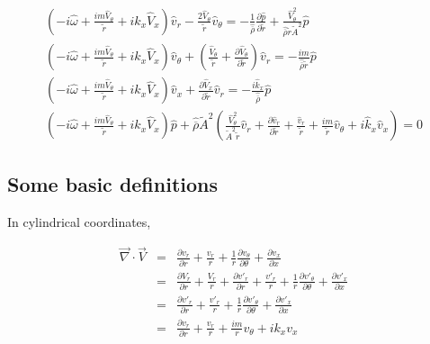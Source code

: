 \documentclass[12pt]{article}
\begin{document}
\begin{small}
\begin{eqnarray}
\left(
-i \widehat{\omega} 
+ \frac{i m \widehat{V}_{\theta}}{\widetilde{r}}
+i \widehat{k}_x \widehat{V}_x 
\right) 
\widehat{v}_r 
-\frac{2 \widehat{V}_{\theta}}{\widetilde{r}} \widehat{v}_{\theta}
 = 
-\frac{1}{\widehat{\overline{\rho}}} \frac{\partial \widehat{p}}{\partial \widetilde{r}}
+\frac{\widehat{V}_{\theta}^2}{\widehat{\overline{\rho}} \widetilde{r} \widetilde{A}^2} 
\widehat{p}
\nonumber
\\
\left(
-i \widehat{\omega} 
+ \frac{i m \widehat{V}_{\theta}}{\widetilde{r}}
+i \widehat{k}_x \widehat{V}_x 
\right) 
\widehat{v}_{\theta} 
+
\left(
\frac{\widehat{V}_{\theta}}{\widetilde{r}}
+\frac{\partial \widehat{V}_{\theta}}{\partial \widetilde{r}}
\right) \widehat{v}_r
 = 
-\frac{i m}{\widehat{\overline{\rho}} \widetilde{r}} \widehat{p}
\nonumber
\\
\left(
-i \widehat{\omega}
+ \frac{i m \widehat{V}_{\theta}}{\widetilde{r}}
+i \widehat{k}_x \widehat{V}_x 
\right) 
\widehat{v}_{x} 
+\frac{\partial \widehat{V}_x}{\partial \widetilde{r}} \widehat{v}_r
 = 
-\frac{i \widehat{k}_x}{\widehat{\overline{\rho}}} \widehat{p}
\nonumber
\\
\left(
-i \widehat{\omega}
+ \frac{i m \widehat{V}_{\theta}}{\widetilde{r}}
+i \widehat{k}_x \widehat{V}_x 
\right) 
\widehat{p} 
+
\widehat{\overline{\rho}} \widetilde{A}^2
\left(
\frac{\widehat{V}_{\theta}^2}{\widetilde{A}^2 \widetilde{r}}
\widehat{v}_r
+ 
\frac{\partial \widehat{v}_r}{\partial \widetilde{r}}
+ 
\frac{\widehat{v}_r}{\widetilde{r}} 
+\frac{i m }{\widetilde{r}} \widehat{v}_{\theta} 
+ i \widehat{k}_x \widehat{v}_x
\right)
 = 
0
\nonumber
\end{eqnarray}
\end{small}%

\subsection{Some basic definitions}

In cylindrical coordinates,

\begin{eqnarray}
\vec{\nabla} \cdot \vec{V}
&=&
\frac{\partial v_r}{\partial r}
+ \frac{v_r}{r}
+ \frac{1}{r}
\frac{\partial v_{\theta}}{\partial \theta}
+\frac{\partial v_x}{\partial x}
\nonumber
\\
&=&
\frac{\partial V_r}{\partial r}
+ \frac{V_r}{r}
+\frac{\partial v'_r}{\partial r}
+ \frac{v'_r}{r}
+ \frac{1}{r}
\frac{\partial v'_{\theta}}{\partial \theta}
+\frac{\partial v'_x}{\partial x}
\nonumber
\\
&=&
\frac{\partial v'_r}{\partial r}
+ \frac{v'_r}{r}
+ \frac{1}{r}
\frac{\partial v'_{\theta}}{\partial \theta}
+\frac{\partial v'_x}{\partial x}
\nonumber
\\
&=&
\frac{\partial v_r}{\partial r}
+ \frac{v_r}{r}
+ \frac{i m}{r} v_{\theta}
+i k_x v_x
\nonumber
\end{eqnarray}
\end{document}
